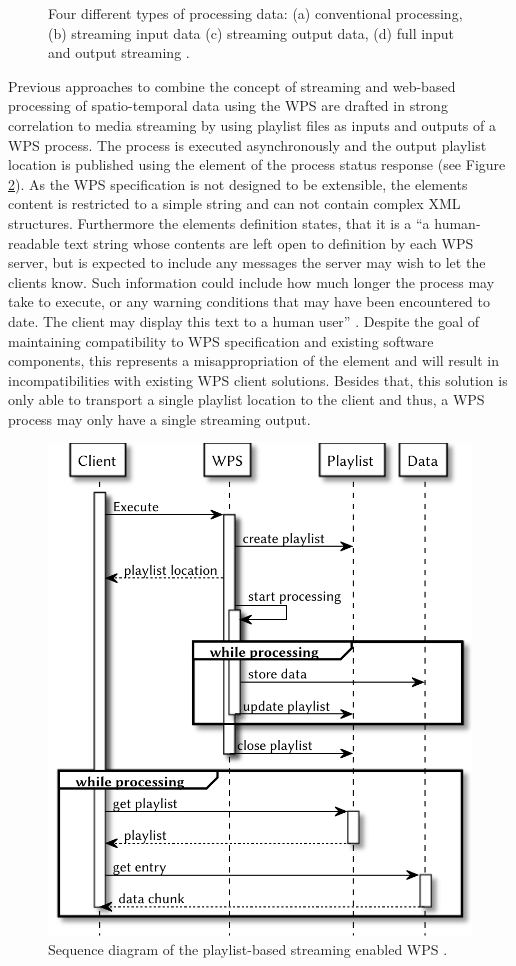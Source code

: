 	\begin{figure}[!htb]
		\centering
		
		\caption{\label{fig:streaming}Four different types of processing data: (a) conventional processing, (b) streaming input data (c) streaming output data, (d) full input and output streaming \citep[based on][]{foerster2012live}.}
	\end{figure}
	Previous approaches to combine the concept of streaming and web-based processing of spatio-temporal data using the \ac{WPS} are drafted in strong correlation to media streaming \citep{foerster2012live} by using playlist files \citep{ietf:draft-pantos-http-live-streaming-12} as inputs and outputs of a \ac{WPS} process. The process is executed asynchronously and the output playlist location is published using the  element of the process status response (see Figure \ref{fig:sd:previous}). As the \ac{WPS} specification is not designed to be extensible, the elements content is restricted to a simple string and can not contain complex \ac{XML} structures. Furthermore the elements definition states, that it is a ``a human-readable text string whose contents are left open to definition by each WPS server, but is expected to include any messages the server may wish to let the clients know. Such information could include how much longer the process may take to execute, or any warning conditions that may have been encountered to date. The client may display this text to a human user'' \citep{ogc:wps}. Despite the goal of maintaining compatibility to \ac{WPS} specification and existing software components, this represents a misappropriation of the element and will result in incompatibilities with existing \ac{WPS} client solutions. Besides that, this solution is only able to transport a single playlist location to the client and thus, a \ac{WPS} process may only have a single streaming output.

	\begin{figure}[!htb]
		\centering
		\includegraphics[width=.6\textwidth]{figures/sequence-diagramm-previous.pdf}
		\caption{\label{fig:sd:previous} Sequence diagram of the playlist-based streaming enabled WPS \citep{foerster2012live}.}
	\end{figure}


